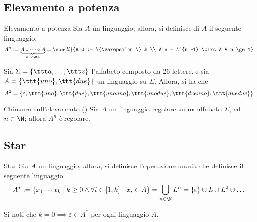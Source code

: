 \documentclass[a4paper, 12pt]{report}
\begin{document}
    \subsection{Elevamento a potenza}

    \begin{frameddefn}{Elevamento a potenza}
        Sia $A$ un linguaggio; allora, si definisce  di $A$ il seguente linguaggio: $$A^n := \underbrace{A \circ \cdots \circ A}_{n \ \textrm{volte}} = \soe{ll}{A^0 := \{\varepsilon \} & \\ A^n = A^{n -1} \circ A & n \ge 1}$$
    \end{frameddefn}

    \begin{example}
        Sia $\Sigma = \{\ttt a , \ldots, \ttt z\}$ l'alfabeto composto da 26 lettere, e sia $A = \{\ttt{uno}, \ttt{due}\}$ un linguaggio su $\Sigma$. Allora, si ha che $$A^2 = \{\varepsilon, \ttt{uno}, \ttt{due}, \ttt{unouno}, \ttt{unodue}, \ttt{dueuno}, \ttt{duedue}\}$$
    \end{example}

    \begin{framedprop}{Chiusura sull'elevamento (\REG)}
        Sia $A$ un linguaggio regolare su un alfabeto $\Sigma$, ed $n \in \N$; allora $A^n$ è regolare.
    \end{framedprop}


    \subsection{Star}

    \begin{frameddefn}{Star}
        Sia $A$ un linguaggio; allora, si definisce l'operazione unaria  che definisce il seguente linguaggio: $$A^* := \{x_1 \cdots x_k \mid k \ge 0 \land \forall i \in [1, k] \quad x_i \in A\} = \displaystyle \bigcup_{n \in \N}{L^n}=\{ \varepsilon \} \cup L \cup L^2 \cup \ldots$$

        Si noti che $k = 0 \implies \varepsilon \in A^*$ per ogni linguaggio $A$.
    \end{frameddefn}
\end{document}
